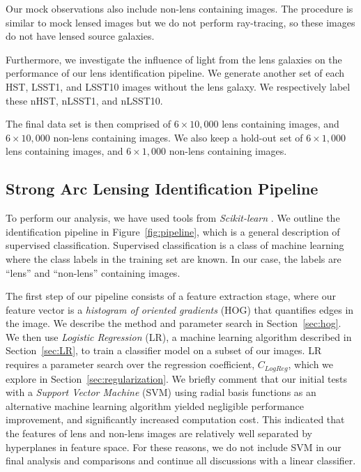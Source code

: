\documentclass{emulateapj}
\begin{document}
Our mock observations also include non-lens containing images.  The
procedure is similar to mock lensed images but we do not perform
ray-tracing, so these images do not have lensed source galaxies.  

Furthermore, we investigate the influence of light from the lens
galaxies on the performance of our lens identification pipeline.  We
generate another set of each HST, LSST1, and LSST10 images without the
lens galaxy.  We respectively label these nHST, nLSST1, and nLSST10.

The final data set is then comprised of $6\times10,000$ lens
containing images, and $6\times 10,000$ non-lens containing images.
We also keep a hold-out set of $6\times 1,000$ lens containing images,
and $6\times 1,000$ non-lens containing images.


\subsection{Strong Arc Lensing Identification Pipeline}

To perform our analysis, we have used tools from {\em Scikit-learn}
\citep{pedregosa_etal12}.  We outline the identification pipeline in
Figure~\ref{fig:pipeline}, which is a general description of
supervised classification.  Supervised classification is a class of
machine learning where the class labels in the training
set are known.  In our case, the labels are ``lens'' and ``non-lens''
containing images.

The first step of our pipeline consists of a feature extraction stage,
where our feature vector is a {\em histogram of oriented gradients}
(HOG) \citep{dalalandtriggs_05} that quantifies edges in the image.  We
describe the method and parameter search in Section~\ref{sec:hog}.  We
then use {\em Logistic Regression} (LR), a machine learning algorithm
described in Section~\ref{sec:LR}, to train a classifier model on a
subset of our images.  LR requires a parameter search over the
regression coefficient, $C_{LogReg}$, which we explore in
Section~\ref{sec:regularization}.  We briefly comment that our initial
tests with a {\em Support Vector Machine} (SVM) using radial basis
functions as an alternative
machine learning algorithm yielded negligible performance improvement,
and significantly increased computation cost.  This indicated that the
features of lens and non-lens images are relatively well separated by
hyperplanes in feature space.  For these reasons, we do not include
SVM in our final analysis and comparisons and continue all discussions
with a linear classifier.
\end{document}
